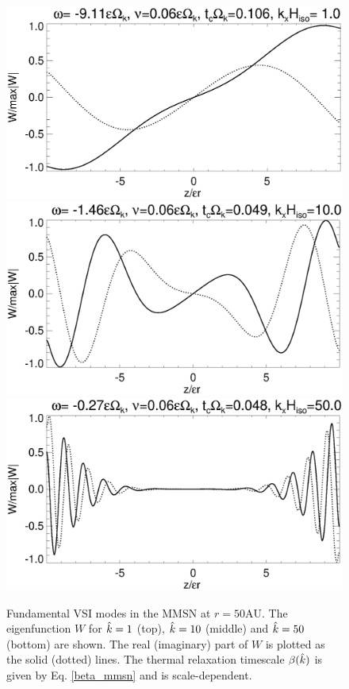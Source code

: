 \begin{figure}
   \includegraphics[width=\linewidth,clip=true,trim=0cm 1.75cm 0cm
  0cm]{figures/eigenvectorW_mmsnkx1.ps}
  \includegraphics[width=\linewidth,clip=true,trim=0cm 1.75cm 0cm
  0cm]{figures/eigenvectorW_mmsnkx10.ps} 
  \includegraphics[width=\linewidth,clip=true,trim=0cm 0cm 0cm
  0cm]{figures/eigenvectorW_mmsnkx50.ps} 
  \caption{Fundamental VSI modes in the MMSN at
    $r=50\mathrm{AU}$. The eigenfunction $W$ for $\hat{k}=1$ (top),
    $\hat{k}=10$ 
    (middle) and $\hat{k}=50$ (bottom) are shown. The real (imaginary)
    part of $W$ is plotted as the solid (dotted)
    lines. The thermal relaxation timescale $\beta(\hat{k})$ is given by
    Eq. \ref{beta_mmsn} and is scale-dependent. \label{mmsn_eigenW}}    
\end{figure}
